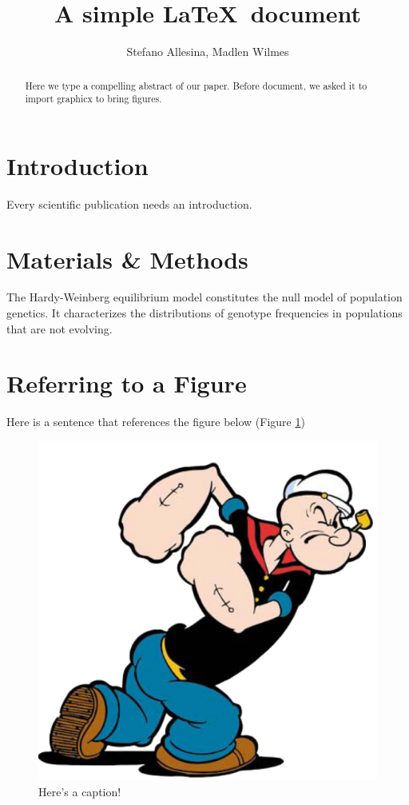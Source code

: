 \documentclass[12pt]{article}
\title{A simple \LaTeX\ document}
\author{Stefano Allesina, Madlen Wilmes}
\date{}
\begin{document}
\maketitle
\begin{abstract}
Here we type a compelling abstract of our paper. Before document, we asked it to import graphicx to bring figures. 
\end{abstract}
\section{Introduction}
Every scientific publication needs an introduction.
\section{Materials \& Methods}
The Hardy-Weinberg equilibrium model constitutes the null model of population genetics. It characterizes the distributions of genotype  frequencies in populations that are not evolving.
\section{Referring to a Figure}
Here is a sentence that references the figure below (Figure \ref{fig:pop})

\begin{figure}
  \label{fig:pop}
\begin{center}
 \includegraphics[width=0.5\linewidth]{figures/popeye.png}
\end{center}
\caption{Here's a caption!}

 \end{figure}
\end{document}
